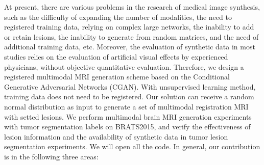 \documentclass[letterpaper]{article} %
\begin{document}
At present, there are various problems in the research of medical image synthesis, such as the difficulty of expanding the number of modalities, the need to registered training data, relying on complex large networks, the inability to add or retain lesions, the inability to generate from random matrices, and the need of additional training data, etc. Moreover, the evaluation of synthetic data in most studies relies on the evaluation of artificial visual effects by experienced physicians, without objective quantitative evaluation. Therefore, we design a registered multimodal MRI generation scheme based on the Conditional Generative Adversarial Networks (CGAN)\cite{70mirza2014conditional}. With unsupervised learning method, training data does not need to be registered. Our solution can receive a random normal distribution as input to generate a set of multimodal registration MRI with setted lesions. We perform multimodal brain MRI generation experiments with tumor segmentation labels on BRATS2015, and verify the effectiveness of lesion information and the availability of synthetic data in tumor lesion segmentation experiments. We will open all the code. In general, our contribution is in the following three areas:
\end{document}
